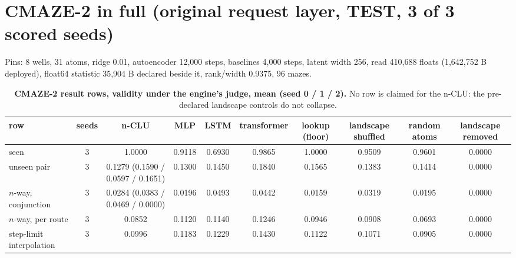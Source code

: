 \documentclass{article} %
\begin{document}
\section{CMAZE-2 in full (original request layer, TEST, 3 of 3 scored seeds)}
\label{app:cmaze2}

Pins: 8 wells, 31 atoms, ridge 0.01, autoencoder 12,000 steps, baselines 4,000 steps, latent width
256, read 410,688 floats (1,642,752 B deployed), float64 statistic 35,904 B declared beside it,
rank/width 0.9375, 96 mazes. %

\begin{table}[h]
\centering\scriptsize
\caption{\textbf{CMAZE-2 result rows, validity under the engine's judge, mean (seed 0 / 1 / 2).} No
row is claimed for the n-CLU: the pre-declared landscape controls do not collapse.}
\label{tab:cmaze2}
\setlength{\tabcolsep}{1.8pt}
\begin{adjustbox}{max width=\linewidth}\begin{tabular}{lccccccccc}
\toprule
row & seeds & n-CLU & MLP & LSTM & transformer & lookup (floor) & landscape shuffled & random atoms & landscape removed \\
\midrule
seen & 3 & 1.0000 & 0.9118 & 0.6930 & 0.9865 & 1.0000 & 0.9509 & 0.9601 & 0.0000 \\
unseen pair & 3 & 0.1279 (0.1590 / 0.0597 / 0.1651) & 0.1300 & 0.1450 & 0.1840 & 0.1565 & 0.1383 & 0.1414 & 0.0000 \\
$n$-way, conjunction & 3 & 0.0284 (0.0383 / 0.0469 / 0.0000) & 0.0196 & 0.0493 & 0.0442 & 0.0159 & 0.0319 & 0.0195 & 0.0000 \\
$n$-way, per route & 3 & 0.0852 & 0.1120 & 0.1140 & 0.1246 & 0.0946 & 0.0908 & 0.0693 & 0.0000 \\
step-limit interpolation & 3 & 0.0996 & 0.1183 & 0.1229 & 0.1430 & 0.1122 & 0.1071 & 0.0905 & 0.0000 \\
\bottomrule
\end{tabular}\end{adjustbox}
\end{table}
\end{document}
